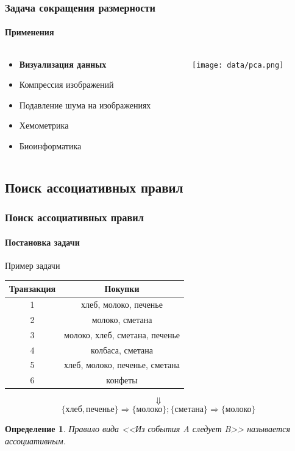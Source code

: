 \documentclass[xcolor=table]{beamer}
\newtheorem{defn}{Определение}
\begin{document}
\begin{frame}
  \frametitle{Задача сокращения размерности}
  \framesubtitle{Применения}

  \begin{columns}
    \begin{column}{0.44\textwidth}
      \begin{itemize}
      \item \textbf{Визуализация данных}
        \vspace{1pt}
      \item Компрессия изображений
        \vspace{5pt}
      \item Подавление шума на изображениях
        \vspace{5pt}
      \item Хемометрика
        \vspace{5pt}
      \item Биоинформатика
      \end{itemize}
    \end{column}
  
    \begin{column}{0.56\textwidth}
      {\texttt{[image: data/pca.png]}}
    \end{column}

  \end{columns}
\end{frame}


\subsection{Поиск ассоциативных правил}
\begin{frame}
  \frametitle{Поиск ассоциативных правил}
  \framesubtitle{Постановка задачи}

  \begin{center}
    Пример задачи \\ \vspace{10pt}
    \begin{tabular}{|c|c|}
      \hline
      Транзакция & Покупки \\ \hline
      1 & хлеб, молоко, печенье \\ \hline
      2 & молоко, сметана \\ \hline
      3 & молоко, хлеб, сметана, печенье \\ \hline
      4 & колбаса, сметана \\ \hline
      5 & хлеб, молоко, печенье, сметана \\ \hline
      6 & конфеты \\ \hline
    \end{tabular}
    \[ \Downarrow \]
    \[ \{\text{хлеб}, \text{печенье}\} \Rightarrow \{\text{молоко}\}; \{\text{сметана}\} \Rightarrow \{\text{молоко}\} \]
  \end{center}  

  \begin{defn}
    Правило вида <<Из события A следует B>> называется ассоциативным.
  \end{defn}
\end{frame}
\end{document}
